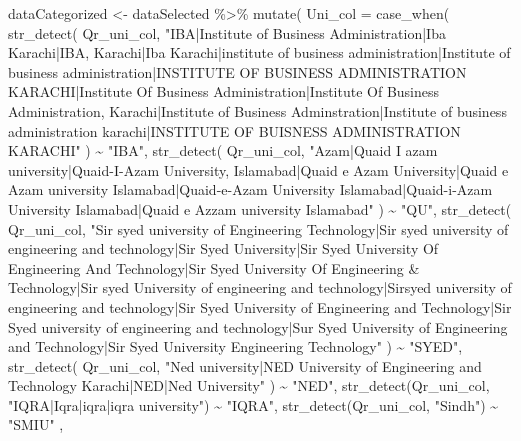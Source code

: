 \documentclass[
]{article}
\newenvironment{Shaded}{\begin{snugshade}}{\end{snugshade}}
\newcommand{\AttributeTok}[1]{\textcolor[rgb]{0.77,0.63,0.00}{#1}}
\newcommand{\FunctionTok}[1]{\textcolor[rgb]{0.00,0.00,0.00}{#1}}
\newcommand{\NormalTok}[1]{#1}
\newcommand{\OtherTok}[1]{\textcolor[rgb]{0.56,0.35,0.01}{#1}}
\newcommand{\SpecialCharTok}[1]{\textcolor[rgb]{0.00,0.00,0.00}{#1}}
\newcommand{\StringTok}[1]{\textcolor[rgb]{0.31,0.60,0.02}{#1}}
\begin{document}
\begin{Shaded}
\begin{Highlighting}[]
\NormalTok{dataCategorized }\OtherTok{\textless{}{-}}\NormalTok{ dataSelected }\SpecialCharTok{\%\textgreater{}\%}
  \FunctionTok{mutate}\NormalTok{(}
    \AttributeTok{Uni\_col =} \FunctionTok{case\_when}\NormalTok{(}
      \FunctionTok{str\_detect}\NormalTok{(}
\NormalTok{        Qr\_uni\_col,}
        \StringTok{"IBA|Institute of Business Administration|Iba Karachi|IBA, Karachi|Iba Karachi|institute of business administration|Institute of business administration|INSTITUTE OF BUSINESS ADMINISTRATION KARACHI|Institute Of Business Administration|Institute Of Business Administration, Karachi|Institute of Business Adminstration|Institute of business administration karachi|INSTITUTE OF BUISNESS ADMINISTRATION KARACHI"}
\NormalTok{      ) }\SpecialCharTok{\textasciitilde{}} \StringTok{"IBA"}\NormalTok{,}
      \FunctionTok{str\_detect}\NormalTok{(}
\NormalTok{        Qr\_uni\_col,}
        \StringTok{"Azam|Quaid I azam university|Quaid{-}I{-}Azam University, Islamabad|Quaid e Azam University|Quaid e Azam university       Islamabad|Quaid{-}e{-}Azam University Islamabad|Quaid{-}i{-}Azam University Islamabad|Quaid e Azzam university Islamabad"}
\NormalTok{      ) }\SpecialCharTok{\textasciitilde{}} \StringTok{"QU"}\NormalTok{,}
      \FunctionTok{str\_detect}\NormalTok{(}
\NormalTok{        Qr\_uni\_col,}
        \StringTok{"Sir syed university of Engineering Technology|Sir syed university of engineering and technology|Sir Syed University|Sir Syed University Of Engineering And Technology|Sir Syed University Of Engineering \& Technology|Sir syed University of engineering and technology|Sirsyed university of engineering and technology|Sir Syed University of Engineering and Technology|Sir Syed university of engineering and technology|Sur Syed University of Engineering and Technology|Sir Syed University Engineering Technology"}
\NormalTok{      ) }\SpecialCharTok{\textasciitilde{}} \StringTok{"SYED"}\NormalTok{,}
      \FunctionTok{str\_detect}\NormalTok{(}
\NormalTok{        Qr\_uni\_col,}
        \StringTok{"Ned university|NED University of Engineering and Technology Karachi|NED|Ned University"}
\NormalTok{      ) }\SpecialCharTok{\textasciitilde{}} \StringTok{"NED"}\NormalTok{,}
      \FunctionTok{str\_detect}\NormalTok{(Qr\_uni\_col, }\StringTok{"IQRA|Iqra|iqra|iqra university"}\NormalTok{) }\SpecialCharTok{\textasciitilde{}} \StringTok{"IQRA"}\NormalTok{,}
      \FunctionTok{str\_detect}\NormalTok{(Qr\_uni\_col, }\StringTok{"Sindh"}\NormalTok{) }\SpecialCharTok{\textasciitilde{}} \StringTok{"SMIU"}\NormalTok{ ,}

\end{Highlighting}
\end{Shaded}
\end{document}
